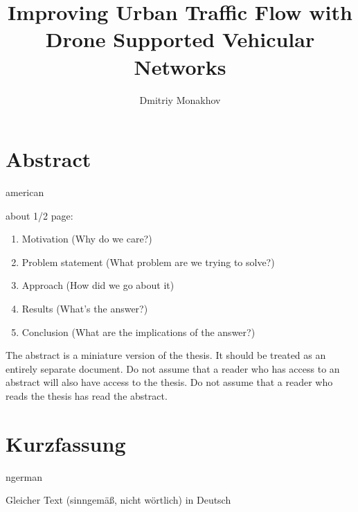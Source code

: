 \documentclass[]{nsm-thesis}
\author{Dmitriy Monakhov}
\title{Improving Urban Traffic Flow with Drone Supported Vehicular Networks}
\begin{document}

\maketitle

\cleardoublepage


\chapter*{Abstract}
\begin{otherlanguage*}{american}


about 1/2 page:
\begin{enumerate}
    \item Motivation (Why do we care?)
    \item Problem statement (What problem are we trying to solve?)
    \item Approach (How did we go about it)
    \item Results (What's the answer?)
    \item Conclusion (What are the implications of the answer?)
\end{enumerate}

The abstract is a miniature version of the thesis.
It should be treated as an entirely separate document.
Do not assume that a reader who has access to an abstract will also have access to the thesis.
Do not assume that a reader who reads the thesis has read the abstract.

\end{otherlanguage*}


\chapter*{Kurzfassung}
\begin{otherlanguage*}{ngerman}

Gleicher Text (sinngemäß, nicht wörtlich) in Deutsch

\end{otherlanguage*}
\acresetall

\cleardoublepage
\setcounter{tocdepth}{1}
\tableofcontents

\end{document}
